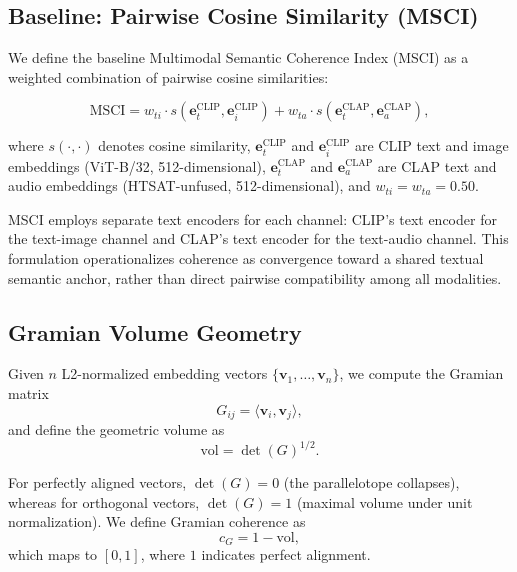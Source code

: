 \documentclass[a4paper,fleqn]{cas-sc}
\begin{document}

\begin{itemize}
\subsection{Baseline: Pairwise Cosine Similarity (MSCI)}

We define the baseline Multimodal Semantic Coherence Index (MSCI) as a weighted combination of pairwise cosine similarities:

\begin{equation}
\text{MSCI} =
w_{ti} \cdot s\!\left(\mathbf{e}_t^{\text{CLIP}}, \mathbf{e}_i^{\text{CLIP}}\right)
+
w_{ta} \cdot s\!\left(\mathbf{e}_t^{\text{CLAP}}, \mathbf{e}_a^{\text{CLAP}}\right),
\end{equation}

where $s(\cdot,\cdot)$ denotes cosine similarity, $\mathbf{e}_t^{\text{CLIP}}$ and $\mathbf{e}_i^{\text{CLIP}}$ are CLIP text and image embeddings (ViT-B/32, 512-dimensional), $\mathbf{e}_t^{\text{CLAP}}$ and $\mathbf{e}_a^{\text{CLAP}}$ are CLAP text and audio embeddings (HTSAT-unfused, 512-dimensional), and $w_{ti} = w_{ta} = 0.50$.

MSCI employs separate text encoders for each channel: CLIP's text encoder for the text-image channel and CLAP's text encoder for the text-audio channel. This formulation operationalizes coherence as convergence toward a shared textual semantic anchor, rather than direct pairwise compatibility among all modalities.

\subsection{Gramian Volume Geometry}

Given $n$ L2-normalized embedding vectors $\{\mathbf{v}_1, \ldots, \mathbf{v}_n\}$, we compute the Gramian matrix
\begin{equation}
G_{ij} = \langle \mathbf{v}_i, \mathbf{v}_j \rangle,
\end{equation}
and define the geometric volume as
\begin{equation}
\text{vol} = \det(G)^{1/2}.
\end{equation}

For perfectly aligned vectors, $\det(G)=0$ (the parallelotope collapses), whereas for orthogonal vectors, $\det(G)=1$ (maximal volume under unit normalization). We define Gramian coherence as
\begin{equation}
c_G = 1 - \text{vol},
\end{equation}
which maps to $[0,1]$, where $1$ indicates perfect alignment.


\end{itemize}
\end{document}
